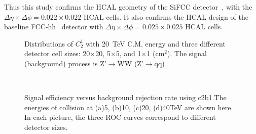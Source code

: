 \documentclass[12pt,twoside,a4paper,an,final]{cms-tdr}
\begin{document}
Thus this study confirms the  HCAL geometry of the SiFCC detector~\cite{Chekanov:2016ppq},
with the $\Delta \eta \times \Delta \phi = 0.022\times0.022$ HCAL cells.
It also confirms the HCAL design of the baseline FCC-hh~\cite{fcc1,fcc2} detector with
$\Delta \eta \times \Delta \phi = 0.025\times0.025$ HCAL cells.
\begin{figure}
\begin{center}
   \end{center}
\caption{Distributions of $C_{2}^{1}$ with 20~TeV C.M. energy and three different detector cell sizes: 20$\times$20, 
5$\times$5, and 1$\times$1 ($\mathrm{cm}^{2}$). The signal (background) process is 
Z'$\rightarrow$WW (Z'$\rightarrow$q$\bar{\mathrm{q}}$)}
\label{fig:Rawhit_05GeV_c2b1_Dis}
\end{figure}

\begin{figure}
\begin{center}
   \\
\end{center}
\caption{Signal efficiency versus background rejection rate using c2b1.The energies of collision at (a)5, (b)10, (c)20, (d)40TeV are shown here. In each picture, the three ROC curves correspond to different detector sizes.}
\label{fig:Rawhit_05GeV_c2b1_ROC}
\end{figure}
\end{document}
